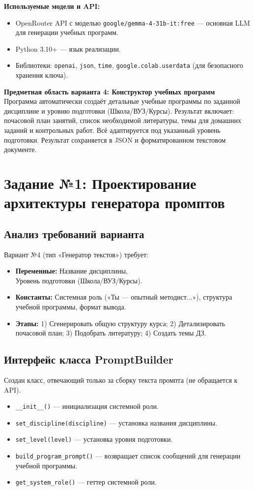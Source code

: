 \documentclass[oneside,a4paper,14pt]{extarticle} %
\begin{document}
\noindent
\textbf{Используемые модели и API:}
\begin{itemize}
    \item OpenRouter API с моделью \texttt{google/gemma-4-31b-it:free} --- основная LLM для генерации учебных программ.
    \item Python 3.10+ --- язык реализации.
    \item Библиотеки: \texttt{openai}, \texttt{json}, \texttt{time}, \texttt{google.colab.userdata} (для безопасного хранения ключа).
\end{itemize}

\noindent
\textbf{Предметная область варианта 4: Конструктор учебных программ} \\
Программа автоматически создаёт детальные учебные программы по заданной дисциплине и уровню подготовки (Школа/ВУЗ/Курсы). Результат включает: почасовой план занятий, список необходимой литературы, темы для домашних заданий и контрольных работ. Всё адаптируется под указанный уровень подготовки. Результат сохраняется в JSON и форматированном текстовом документе.

\newpage
\section{Задание №1: Проектирование архитектуры генератора промптов}
\subsection{Анализ требований варианта}
\noindent
Вариант №4 (тип «Генератор текстов») требует:
\begin{itemize}
    \item \textbf{Переменные:} Название дисциплины, \\ Уровень подготовки (Школа/ВУЗ/Курсы).
    \item \textbf{Константы:} Системная роль («Ты — опытный методист...»), структура учебной программы, формат вывода.
    \item \textbf{Этапы:} 1) Сгенерировать общую структуру курса; 2) Детализировать почасовой план; 3) Подобрать литературу; 4) Создать темы ДЗ.
\end{itemize}

\subsection{Интерфейс класса PromptBuilder}
\noindent
Создан класс, отвечающий только за сборку текста промпта (не обращается к API).
\begin{itemize}
    \item \texttt{\_\_init\_\_()} --- инициализация системной роли.
    \item \texttt{set\_discipline(discipline)} --- установка названия дисциплины.
    \item \texttt{set\_level(level)} --- установка уровня подготовки.
    \item \texttt{build\_program\_prompt()} --- возвращает список сообщений для генерации учебной программы.
    \item \texttt{get\_system\_role()} --- геттер системной роли.
\end{itemize}
\end{document}
